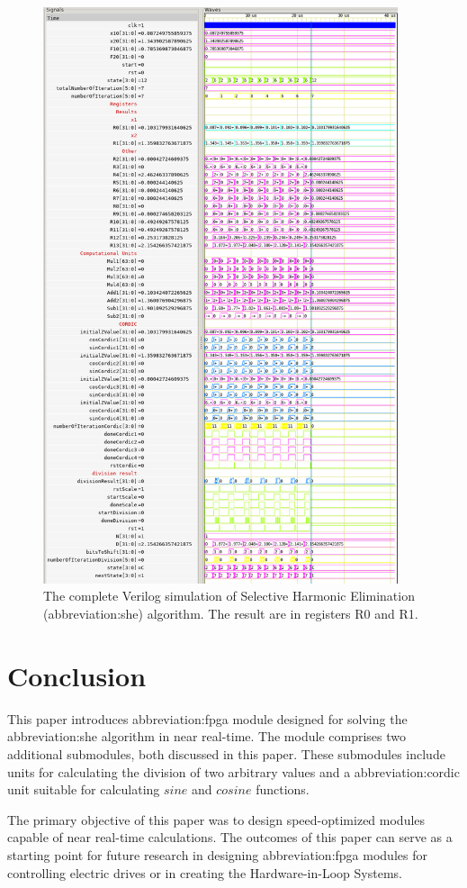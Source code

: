 \documentclass[a4paper, twoside, 11pt]{article}
\begin{document}
            \begin{figure}[htbp!]
                \centering
                \includegraphics[width=0.93\textwidth]{src/png/inverted/she-sim-all.png}
                \caption{The complete Verilog simulation of Selective Harmonic Elimination (\gls{abbreviation:she}) algorithm. The result are in registers R0 and R1.}
                \label{fig:she-sim-all}
            \end{figure}
\newpage
{} 
\section*{Conclusion}
This paper introduces \gls{abbreviation:fpga} module designed for solving the \gls{abbreviation:she} algorithm in near real-time. The module comprises two additional submodules, both discussed in this paper. These submodules include units for calculating the division of two arbitrary values and a \gls{abbreviation:cordic} unit suitable for calculating $sine$ and $cosine$ functions.\par
The primary objective of this paper was to design speed-optimized modules capable of near real-time calculations. The outcomes of this paper can serve as a starting point for future research in designing \gls{abbreviation:fpga} modules for controlling electric drives or in creating the Hardware-in-Loop Systems.
\end{document}
